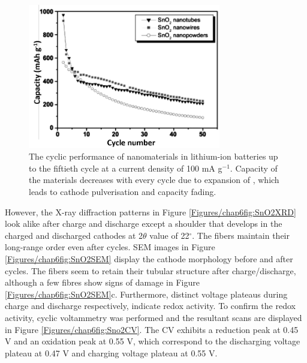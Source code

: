 \begin{figure}[th!]
\centering
\includegraphics[width=0.75\textwidth]{Figures/chap6fig/sno2pap.pdf}
\caption{The cyclic performance of  nanomaterials in lithium-ion batteries up to the fiftieth cycle at a current density of 100 mA g$^{-1}$. Capacity of the materials decreases with every cycle due to expansion of , which leads to cathode pulverisation and capacity fading.}
\label{Figures/chap6fig:sno2pap}
\end{figure}

However, the X-ray diffraction patterns in Figure \ref{Figures/chap6fig:SnO2XRD} look alike after charge and discharge except a shoulder that develops in the charged and discharged cathodes at 2$\theta$ value of 22$^{\circ}$. The fibers maintain their long-range order even after cycles. SEM images in Figure \ref{Figures/chap6fig:SnO2SEM} display the cathode morphology before and after cycles. The fibers seem to retain their tubular structure after charge/discharge, although a few fibres show signs of damage in Figure \ref{Figures/chap6fig:SnO2SEM}c. Furthermore, distinct voltage plateaus during charge and discharge respectively, indicate redox activity. To confirm the redox activity, cyclic voltammetry was performed and the resultant scans are displayed in Figure \ref{Figures/chap6fig:Sno2CV}. The CV exhibits a reduction peak at 0.45 V and an oxidation peak at 0.55 V, which correspond to the discharging voltage plateau at 0.47 V and charging voltage plateau at 0.55 V. 

